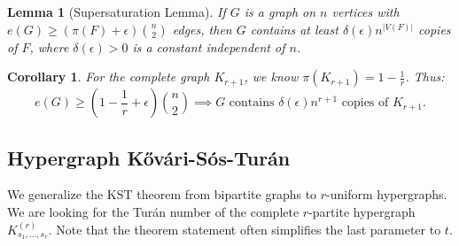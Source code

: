 \documentclass[a4paper]{article}
\newtheorem{lem}[thm]{Lemma}
\newtheorem{cor}[thm]{Corollary}
\begin{document}
\begin{lem}[Supersaturation Lemma]
    If $G$ is a graph on $n$ vertices with $e(G) \geq (\pi(F)+\epsilon)\binom{n}{2}$ edges, then $G$ contains at least $\delta(\epsilon)n^{|V(F)|}$ copies of $F$, where $\delta(\epsilon) > 0$ is a constant independent of $n$.
\end{lem}

\begin{cor}
    For the complete graph $K_{r+1}$, we know $\pi(K_{r+1}) = 1 - \frac{1}{r}$. Thus:
    \[
    e(G) \geq \left( 1-\frac{1}{r}+\epsilon \right)\binom{n}{2} \implies G \text{ contains } \delta(\epsilon)n^{r+1} \text{ copies of } K_{r+1}.
    \]
\end{cor}

\subsection{Hypergraph K\H{o}v\'{a}ri-S\'{o}s-Tur\'{a}n}

We generalize the KST theorem from bipartite graphs to $r$-uniform hypergraphs. We are looking for the Turán number of the complete $r$-partite hypergraph $K_{s_1, \dots, s_r}^{(r)}$. Note that the theorem statement often simplifies the last parameter to $t$.
\end{document}
